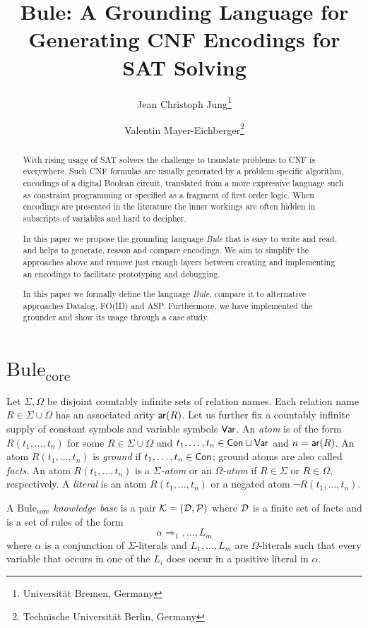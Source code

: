 \documentclass{article}
\title{Bule: A Grounding Language for Generating CNF Encodings for SAT Solving}
\author{Jean Christoph Jung\footnote{Universität Bremen, Germany} \and Valentin Mayer-Eichberger\footnote{Technische Universit\"at Berlin, Germany} \and 
}
\newcommand{\bcore}{\ensuremath{\text{Bule}_\text{core}}\xspace}
\begin{document}
\maketitle

\begin{abstract}
    With rising usage of SAT solvers the challenge to translate problems to CNF
    is everywhere. Such  CNF formulas are usually generated by a problem
    specific algorithm, encodings of a digital Boolean circuit, translated from
    a more expressive language such as constraint programming or specified as a
    fragment of first order logic. When encodings are  presented in the
    literature the inner workings are often hidden in subscripts of variables
    and hard to decipher.

    In this paper we propose the grounding language \emph{Bule} that is easy to
    write and read, and helps to generate, reason and compare encodings. We aim
    to simplify the approaches above and remove just enough layers between
    creating and implementing an encodings to facilitate prototyping and
    debugging. 

    In this paper we formally define the language \emph{Bule}, compare it to
    alternative approaches Datalog, FO(ID) and ASP. Furthermore, we have
    implemented the grounder and show its usage through a case study.
\end{abstract}

\section{\bcore}

Let $\Sigma,\Omega$ be disjoint countably infinite sets of relation
names. Each relation name $R\in \Sigma\cup\Omega$ has an associated
arity $\mathsf{ar}(R)$. Let us further fix a countably infinite supply of
constant symbols  and variable symbols $\mathsf{Var}$. An
\emph{atom} is of the form $R(t_1,\ldots,t_n)$ for some $R\in
\Sigma\cup\Omega$ and $t_1,\ldots,t_n\in\mathsf{Con}\cup\mathsf{Var}$ and
$n=\mathsf{ar}(R)$. An atom $R(t_1,\ldots,t_n)$ is \emph{ground} if
$t_1,\ldots,t_n\in\mathsf{Con}$; ground atoms are also called
\emph{facts}. An atom $R(t_1,\ldots,t_n)$ is a \emph{$\Sigma$-atom} or
an \emph{$\Omega$-atom} if $R\in \Sigma$ or $R\in \Omega$,
respectively. A \emph{literal} is an atom $R(t_1,\ldots,t_n)$ or a negated atom
$\neg R(t_1,\ldots,t_n)$. 

A \emph{\bcore knowledge base} is a pair $\mathcal{K}=(\mathcal{D},\mathcal{P})$ where $\mathcal{D}$ is a
finite set of facts and \Pmc is a set of rules of the form 
%
\[\alpha \Rightarrow _1,\ldots,L_m\]
%
where $\alpha$ is a conjunction of $\Sigma$-literals
and $L_1,\ldots,L_m$ are $\Omega$-literals such that every variable
that occurs in one of the $L_i$ does occur in
a positive literal in $\alpha$.
\end{document}
